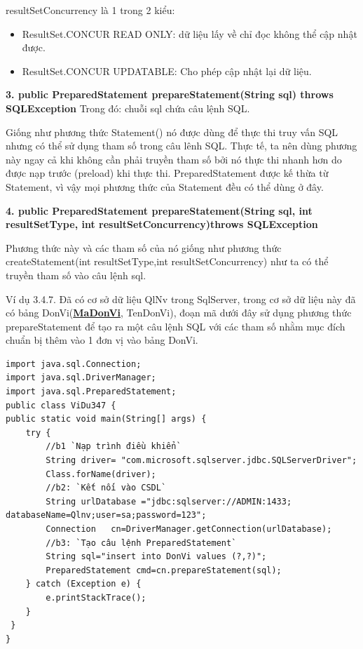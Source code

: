 resultSetConcurrency là 1 trong 2 kiểu:
\begin{itemize}
	\item ResultSet.CONCUR \text{\_}READ \text{\_}ONLY: dữ liệu lấy về chỉ đọc không thể cập nhật được.
	
	\item ResultSet.CONCUR \text{\_}UPDATABLE: Cho phép cập nhật lại dữ liệu.
\end{itemize}

\textbf{3. public PreparedStatement prepareStatement(String sql) throws SQLException}
Trong đó: chuỗi sql chứa câu lệnh SQL.

Giống như phương thức Statement() nó được dùng để thực thi truy vấn SQL nhưng có thể sử dụng tham số trong câu lênh SQL. Thực tế, ta nên dùng phương này ngay cả khi không cần phải truyền tham số bởi nó thực thi nhanh hơn do được nạp trước (preload) khi thực thi. PreparedStatement được kế thừa từ Statement, vì vậy mọi phương thức của Statement đều có thể dùng ở đây.  

\textbf{4. public PreparedStatement prepareStatement(String sql, int resultSetType, int resultSetConcurrency)throws SQLException}

Phương thức này và các tham số của nó giống như phương thức createStatement(int resultSetType,int resultSetConcurrency) như ta có thể truyền tham số vào câu lệnh sql.

Ví dụ 3.4.7. Đã có cơ sở dữ liệu QlNv trong SqlServer, trong cơ sở dữ liệu này đã có bảng DonVi(\textbf{\underline{MaDonVi}}, TenDonVi), đoạn mã dưới đây sử dụng phương thức prepareStatement để tạo ra một câu lệnh SQL với các tham số nhằm mục đích chuẩn bị thêm vào  1 đơn vị vào bảng DonVi.
\begin{lstlisting}[escapechar=`]
import java.sql.Connection;
import java.sql.DriverManager;
import java.sql.PreparedStatement;
public class ViDu347 {
public static void main(String[] args) {
	try { 
		//b1 `Nạp trình điều khiển`
		String driver= "com.microsoft.sqlserver.jdbc.SQLServerDriver";
		Class.forName(driver);
		//b2: `Kết nối vào CSDL`
		String urlDatabase ="jdbc:sqlserver://ADMIN:1433; databaseName=Qlnv;user=sa;password=123";
		Connection   cn=DriverManager.getConnection(urlDatabase);
		//b3: `Tạo câu lệnh PreparedStatement`
		String sql="insert into DonVi values (?,?)";
		PreparedStatement cmd=cn.prepareStatement(sql);
	} catch (Exception e) {
		e.printStackTrace();
	}
 }
}

\end{lstlisting}


